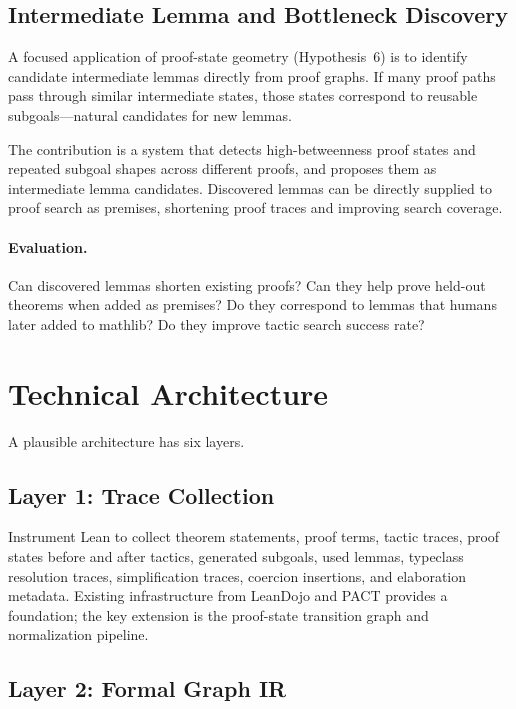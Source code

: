 \documentclass[12pt, a4paper]{article}
\begin{document}
\subsection{Intermediate Lemma and Bottleneck Discovery}

A focused application of proof-state geometry (Hypothesis~6) is to identify
candidate intermediate lemmas directly from proof graphs. If many proof paths
pass through similar intermediate states, those states correspond to reusable
subgoals---natural candidates for new lemmas.

The contribution is a system that detects high-betweenness proof states and
repeated subgoal shapes across different proofs, and proposes them as
intermediate lemma candidates. Discovered lemmas can be directly supplied to
proof search as premises, shortening proof traces and improving search
coverage.

\paragraph{Evaluation.}
Can discovered lemmas shorten existing proofs? Can they help prove held-out
theorems when added as premises? Do they correspond to lemmas that humans
later added to mathlib? Do they improve tactic search success rate?

\section{Technical Architecture}

A plausible architecture has six layers.

\subsection{Layer 1: Trace Collection}
\label{sec:arch-layer1}

Instrument Lean to collect theorem statements, proof terms, tactic traces,
proof states before and after tactics, generated subgoals, used lemmas,
typeclass resolution traces, simplification traces, coercion insertions, and
elaboration metadata. Existing infrastructure from LeanDojo
\citep{yang2023leandojo} and PACT \citep{han2021pact} provides a foundation;
the key extension is the proof-state transition graph and normalization
pipeline.

\subsection{Layer 2: Formal Graph IR}
\end{document}
